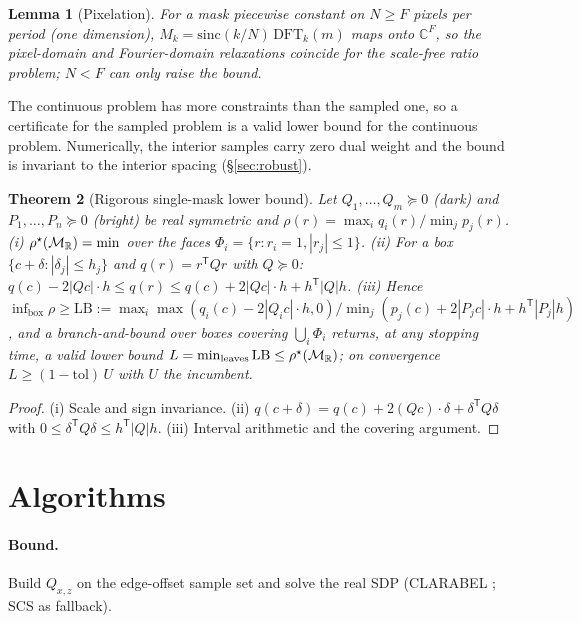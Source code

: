 \documentclass[11pt,a4paper]{article}
\newtheorem{theorem}{Theorem}\newtheorem{lemma}[theorem]{Lemma}\newtheorem{proposition}[theorem]{Proposition}
\newcommand{\R}{\mathbb{R}}\newcommand{\C}{\mathbb{C}}\newcommand{\PSD}{\succeq 0}
\begin{document}
\begin{lemma}[Pixelation]\label{lem:pixel}
For a mask piecewise constant on $N\ge F$ pixels per period (one dimension), $M_k=\mathrm{sinc}(k/N)\,\mathrm{DFT}_k(m)$ maps onto $\C^F$, so the pixel-domain and Fourier-domain relaxations coincide for the scale-free ratio problem; $N<F$ can only raise the bound.
\end{lemma}
\begin{remark}
The continuous problem has more constraints than the sampled one, so a certificate for the sampled problem is a valid lower bound for the continuous problem. Numerically, the interior samples carry zero dual weight and the bound is invariant to the interior spacing (\S\ref{sec:robust}).
\end{remark}
\begin{theorem}[Rigorous single-mask lower bound]\label{thm:bnb}
Let $Q_1,\dots,Q_m\PSD$ (dark) and $P_1,\dots,P_n\PSD$ (bright) be real symmetric and $\rho(r)=\max_iq_i(r)/\min_jp_j(r)$. (i) $\rhostar(\mathcal M_\R)=\min$ over the faces $\Phi_i=\{r:r_i=1,|r_j|\le1\}$. (ii) For a box $\{c+\delta:|\delta_j|\le h_j\}$ and $q(r)=r^{\mathsf T}Qr$ with $Q\PSD$: $q(c)-2|Qc|\cdot h\le q(r)\le q(c)+2|Qc|\cdot h+h^{\mathsf T}|Q|h$. (iii) Hence $\inf_{\text{box}}\rho\ge\mathrm{LB}:=\max_i\max(q_i(c)-2|Q_ic|\cdot h,0)/\min_j(p_j(c)+2|P_jc|\cdot h+h^{\mathsf T}|P_j|h)$, and a branch-and-bound over boxes covering $\bigcup_i\Phi_i$ returns, at any stopping time, a valid lower bound $L=\min_{\text{leaves}}\mathrm{LB}\le\rhostar(\mathcal M_\R)$; on convergence $L\ge(1-\mathrm{tol})\,U$ with $U$ the incumbent.
\end{theorem}
\begin{proof}
(i) Scale and sign invariance. (ii) $q(c+\delta)=q(c)+2(Qc)\cdot\delta+\delta^{\mathsf T}Q\delta$ with $0\le\delta^{\mathsf T}Q\delta\le h^{\mathsf T}|Q|h$. (iii) Interval arithmetic and the covering argument.
\end{proof}

\section{Algorithms}\label{sec:alg}
\paragraph{Bound.} Build $Q_{x,z}$ on the edge-offset sample set and solve the real SDP (CLARABEL \cite{clarabel}; SCS \cite{scs} as fallback).
\end{document}
